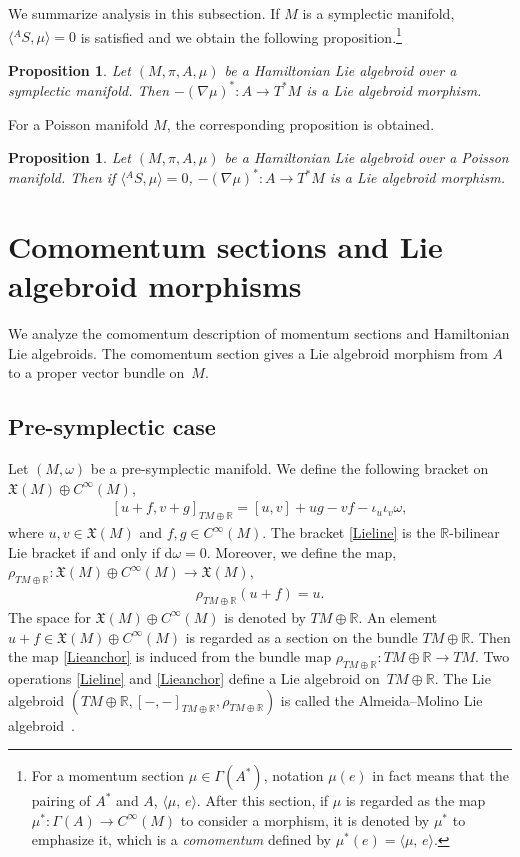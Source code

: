\documentclass[10pt,a4paper]{amsart}
\numberwithin{equation}{section}
\newtheorem{Proposition}[Theorem]{Proposition}
 { \theoremstyle{definition}
\newtheorem{Definition}[Theorem]{Definition}
\newtheorem{Note}[Theorem]{Note}
\newtheorem{Example}[Theorem]{Example}
\newtheorem{Remark}[Theorem]{Remark}
\newtheorem{Question}[Theorem]{Question}
 }
\def\bR{{\mathbb{R}}}
\newcommand{\liebra}[2]{{[{{#1},{#2}}]_{TM \oplus \bR}}}
\newcommand{\rhotr}{\rho_{TM \oplus \bR}}
\newcommand{\bracket}[2]{\langle #1,\,#2\rangle}
\newcommand{\rd}{\mathrm{d}}
\begin{document}
We summarize analysis in this subsection.
If $M$ is a symplectic manifold, $\bigl\langle{}^A S,\mu\bigr\rangle =0$ is satisfied and we obtain the following proposition.\footnote{For a momentum section $\mu \in \Gamma(A^*)$, notation $\mu(e)$ in fact means that the pairing of $A^*$ and $A$, $\bracket{\mu}{e}$. After this section, if $\mu$ is regarded as the map $\mu^*\colon\Gamma(A) \rightarrow C^{\infty}(M)$ to consider a morphism, it is denoted by $\mu^*$ to emphasize it, which is a \textit{comomentum} defined by $\mu^*(e) = \bracket{\mu}{e}$.}
\begin{Proposition}\label{nablamuLAmorphismS}
Let $(M, \pi, A, \mu)$ be a Hamiltonian Lie algebroid over a symplectic manifold.
Then $-(\nabla \mu)^*\colon A \rightarrow T^*M$ is a Lie algebroid morphism.
\end{Proposition}
For a Poisson manifold $M$, the corresponding proposition is obtained.
\begin{Proposition}\label{nablamuLAmorphism}
Let $(M, \pi, A, \mu)$ be a Hamiltonian Lie algebroid over a Poisson manifold.
Then if $\bigl\langle{}^A S,\mu\bigr\rangle =0$, $-(\nabla \mu)^*\colon A \rightarrow T^*M$ is a Lie algebroid morphism.
\end{Proposition}

\section{Comomentum sections and Lie algebroid morphisms}\label{sec:CMSLAM}
We analyze the comomentum description of momentum sections and Hamiltonian Lie algebroids. The comomentum section gives a Lie algebroid morphism from $A$ to a proper vector bundle on~$M$.

\subsection{Pre-symplectic case}\label{presymcom}
Let $(M, \omega)$ be a pre-symplectic manifold.
We define the following bracket on
$\mathfrak{X}(M) \oplus C^{\infty}(M)$,
\begin{gather}
\liebra{u + f}{v + g}
= [u, v] + u g - v f - \iota_u \iota_v \omega,
\label{Lieline}
\end{gather}
where $u, v \in \mathfrak{X}(M)$ and $f, g \in C^{\infty}(M)$.
%
The bracket \eqref{Lieline} is the $\bR$-bilinear Lie bracket
if and only if $\rd \omega = 0$.
Moreover, we define the map,
$\rhotr\colon \mathfrak{X}(M) \oplus C^{\infty}(M)
\rightarrow \mathfrak{X}(M)$,
\begin{gather}
\rhotr(u + f) = u.
\label{Lieanchor}
\end{gather}
The space for $\mathfrak{X}(M) \oplus C^{\infty}(M)$ is denoted by
$TM \oplus \bR$.
An element $u + f \in \mathfrak{X}(M) \oplus C^{\infty}(M)$ is regarded as a
section on the bundle $TM \oplus \bR$.
Then the map \eqref{Lieanchor} is induced from the bundle map
$\rhotr\colon TM \oplus \bR \rightarrow TM$.
Two operations \eqref{Lieline} and \eqref{Lieanchor}
define a Lie algebroid on~${TM \oplus \bR}$.
The Lie algebroid $(TM \oplus \bR, \liebra{-}{-}, \rhotr)$ is
 called the Almeida--Molino Lie algebroid~\cite{Almedia}.
\end{document}
